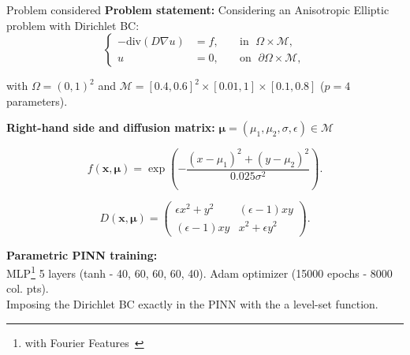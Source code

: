 \begin{frame}{Problem considered} 
	\textbf{Problem statement:} Considering an Anisotropic Elliptic problem with Dirichlet BC:
	\vspace{-5pt}
	\begin{equation*}
		\left\{
		\begin{aligned}
			-\text{div}(D\nabla u) & = f, \; &  & \text{in } \; \Omega\times \mathcal{M}, \\
			u         & =0, \;  &  & \text{on } \; \partial\Omega\times \mathcal{M},
		\end{aligned}
		\right.
	\end{equation*}

	with $\Omega=(0,1)^2$ and $\mathcal{M}=[0.4, 0.6]^2\times [0.01,1]\times [0.1,0.8]$ ($p=4$ parameters).
	
	\vspace{8pt}
	\textbf{Right-hand side and diffusion matrix:} \; $\bm{\mu}=(\mu_1,\mu_2,\sigma,\epsilon)\in\mathcal{M}$

	\begin{equation*}
		f(\bm{x},\bm{\mu})=\exp\left(-\frac{(x-\mu_1)^2+(y-\mu_2)^2}{0.025\sigma^2}\right).
	\end{equation*}
	
	\begin{equation*}
		D(\bm{x},\bm{\mu})=\begin{pmatrix}
			\epsilon x^2+y^2 & (\epsilon-1)xy \\
			(\epsilon-1)xy & x^2+\epsilon y^2
		\end{pmatrix}.
	\end{equation*}

	\vspace{2pt}
	\textbf{Parametric PINN training:} \\ MLP\footnote[frame,1]{with Fourier Features~\parencite{TanSri2020}} 5 layers (tanh - 40, 60, 60, 60, 40).	Adam optimizer (15000 epochs - 8000 col. pts). \\
	Imposing the Dirichlet BC exactly in the PINN with the a level-set function.

	\vspace{5pt}
\end{frame}

